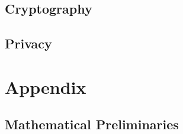 \documentclass{book}
\begin{document}
  \chapter{Cryptography}
    


  \chapter{Privacy}

%
%  

\part{Appendix}

\appendix

\chapter{Mathematical Preliminaries}\label{sec:math}


\tocentryBib

%


\end{document}
